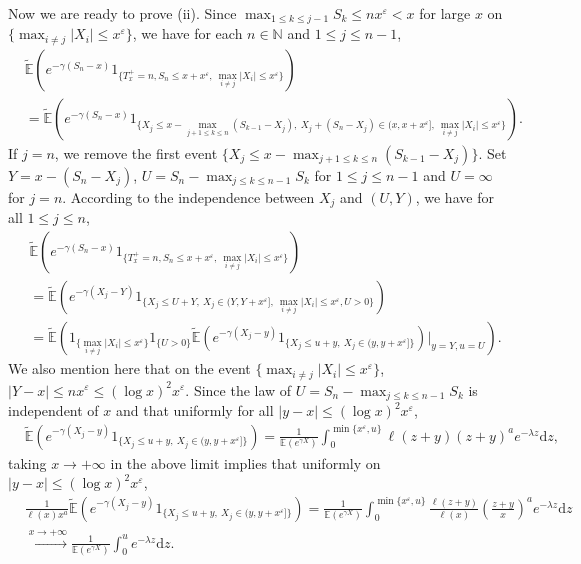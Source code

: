 \documentclass[11pt]{article}
\numberwithin{equation}{section}
\begin{document}
Now we are ready to prove (ii). Since $\max_{1\leq k\leq j-1}S_k \leq n x^\varepsilon <x$ for large $x$ on $\{\max_{i\neq j} |X_i| \leq x^{\varepsilon}\}$, we have for each $n\in \mathbb{N}$ and $1\leq j\leq n-1$, 
\begin{align}\label{e19}
	& \widetilde{\mathbb{E}}\left(e^{-\gamma (S_n-x)}1_{\{T_x^+=n, S_n\leq x+x^\varepsilon, \ \max_{i\neq j} |X_i| \leq x^{\varepsilon}  \}}\right) \nonumber\\
	& =  \widetilde{\mathbb{E}}\left(e^{-\gamma (S_n-x)}1_{\{ X_j \leq x-\max_{j+1\leq k\leq n}(S_{k-1}-X_j),\  X_j + (S_n-X_j) \in (x,x+x^\varepsilon], \ \max_{i\neq j} |X_i| \leq x^{\varepsilon}  \}}\right). 
\end{align}
If $j=n$, we  remove the first event $\{ X_j \leq x-\max_{j+1\leq k\leq n}(S_{k-1}-X_j)\}$. 
 Set $Y=x-( S_n-X_j)$, $U=S_n- \max_{j\leq k\leq n-1} S_k$ for $1\leq j \leq n-1$ and $U=\infty$ for $j=n$. According to the independence between $X_j$ and $(U, Y)$, we have for all $1\leq j\leq n$, 
 \begin{align}
 		& \widetilde{\mathbb{E}}\left(e^{-\gamma (S_n-x)}1_{\{T_x^+=n, S_n\leq x+x^\varepsilon, \ \max_{i\neq j} |X_i| \leq x^{\varepsilon}  \}}\right) \nonumber\\
 	& =  \widetilde{\mathbb{E}}\left(e^{-\gamma (X_j-Y)} 1_{\{ X_j \leq U+Y,\  X_j  \in (Y,Y+x^\varepsilon], \ \max_{i\neq j} |X_i| \leq x^{\varepsilon} , U>0 \}}\right)\nonumber\\
 	& = \widetilde{\mathbb{E}}\left(1_{\{\max_{i\neq j} |X_i| \leq x^{\varepsilon} \}} 1_{\{U>0\}}\widetilde{\mathbb{E}}\left(e^{-\gamma (X_j-y)}1_{\{ X_j \leq u+y,\  X_j  \in (y,y+x^\varepsilon] \}}\right)\Big|_{y=Y, u=U}\right).
 \end{align}
We also mention here that on the event $\{\max_{i\neq j} |X_i| \leq x^{\varepsilon} \}$,  $ |Y-x| \leq n x^\varepsilon \leq (\log x)^2 x^\varepsilon$.  Since  the law of $U= S_n- \max_{j\leq k\leq n-1} S_k$ is independent of $x$ and that  uniformly for all $|y-x| \leq (\log x)^2 x^\varepsilon$,
\begin{align}
	 & \widetilde{\mathbb{E}}\left(e^{-\gamma (X_j-y)}1_{\{ X_j \leq u+y,\  X_j  \in (y,y+x^\varepsilon] \}}\right)  = \frac{1}{\mathbb{E}(e^{\gamma X})}\int_0^{\min\{x^{\varepsilon}, u\} } \ell(z+y) (z+y)^a e^{-\lambda z} \mathrm{d}z,
\end{align}
 taking $x\to+\infty$ in the above limit implies that uniformly on $|y-x| \leq (\log x)^2 x^\varepsilon$,
\begin{align}
	& \frac{ 1 }{\ell(x)x^a}\widetilde{\mathbb{E}}\left(e^{-\gamma (X_j-y)}1_{\{ X_j \leq u+y,\  X_j  \in (y,y+x^\varepsilon] \}}\right)= \frac{1}{\mathbb{E}(e^{\gamma X})}\int_0^{\min\{ x^{\varepsilon}, u\} }\frac{ \ell(z+y)}{\ell (x)} \left(\frac{z+y}{x}\right)^a e^{-\lambda z} \mathrm{d}z \nonumber\\
	 & \stackrel{x\to+\infty}{\longrightarrow} \frac{1}{\mathbb{E}(e^{\gamma X})} \int_0^ue^{-\lambda z}\mathrm{d}z.
\end{align}
\end{document}
